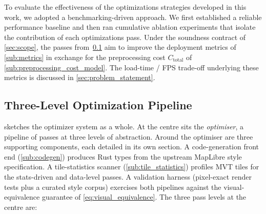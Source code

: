 To evaluate the effectiveness of the optimizations strategies developed in this work, we adopted a benchmarking-driven approach.
We first established a reliable performance baseline and then ran cumulative ablation experiments that isolate the contribution of each optimizations pass.
Under the soundness contract of \cref{sec:scope}, the passes from~\cref{sub:pipeline} aim to improve the deployment metrics of \cref{sub:metrics} in exchange for the preprocessing cost $C_\text{total}$ of \cref{sub:preprocessing_cost_model}.
The load-time / FPS trade-off underlying these metrics is discussed in \cref{sec:problem_statement}.

\subsection{Three-Level Optimization Pipeline}\label{sub:pipeline}

 sketches the optimizer system as a whole.
At the centre sits the \emph{optimiser}, a pipeline of passes at three levels of abstraction.
Around the optimiser are three supporting components, each detailed in its own section.
A code-generation front end (\cref{sub:codegen}) produces Rust types from the upstream MapLibre style specification.
A tile-statistics scanner (\cref{sub:tile_statistics}) profiles \ac{MVT} tiles for the stats-driven and data-level passes.
A validation harness (pixel-exact render tests plus a curated style corpus) exercises both pipelines against the visual-equivalence guarantee of \cref{eq:visual_equivalence}.
The three pass levels at the centre are:

